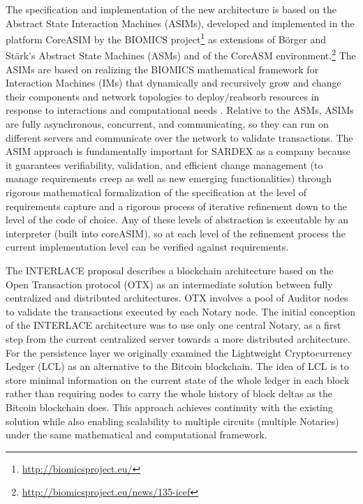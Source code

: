 The specification and implementation of the new architecture is based on the Abstract State Interaction Machines (ASIMs), developed and implemented in the platform CoreASIM by the BIOMICS project\footnote{\url{http://biomicsproject.eu/}} \cite{BIOMICSD41,BIOMICSD42,BIOMICSD52} as extensions of B\"orger and St\"ark's \cite{BoergerStaerk2003} Abstract State Machines (ASMs) and of the CoreASM environment.\footnote{\url{http://biomicsproject.eu/news/135-icef}} The ASIMs are based on realizing the BIOMICS mathematical framework for Interaction Machines (IMs) that dynamically and recursively grow and change their components and network topologies to deploy/reabsorb resources in response to interactions and computational needs \cite{NehanivEtAl2015}. Relative to the ASMs, ASIMs are fully asynchronous, concurrent, and communicating, so they can run on different servers and communicate over the network to validate transactions. The ASIM approach is fundamentally important for SARDEX as a company because it guarantees verifiability, validation, and efficient change management (to manage requirements creep as well as new emerging functionalities) through rigorous mathematical formalization of the specification at the level of requirements capture and a rigorous process of iterative refinement down to the level of the code of choice. Any of these levels of abstraction is executable by an interpreter (built into coreASIM), so at each level of the refinement process the current implementation level can be verified against requirements.

The INTERLACE proposal describes a blockchain architecture based on the Open Transaction protocol (OTX) \cite{Odom} as an intermediate solution between fully centralized and distributed architectures. OTX involves a pool of Auditor nodes to validate the transactions executed by each Notary node. The initial conception of the INTERLACE architecture was to use only one central Notary, as a first step from the current centralized server towards a more distributed architecture. For the persistence layer we originally examined the Lightweight Cryptocurrency Ledger (LCL) \cite{White2015} as an alternative to the Bitcoin blockchain. The idea of LCL is to store minimal information on the current state of the whole ledger in each block rather than requiring nodes to carry the whole history of block deltas as the Bitcoin blockchain does. This approach achieves continuity with the existing solution while also enabling scalability to multiple circuits (multiple Notaries) under the same mathematical and computational framework.

